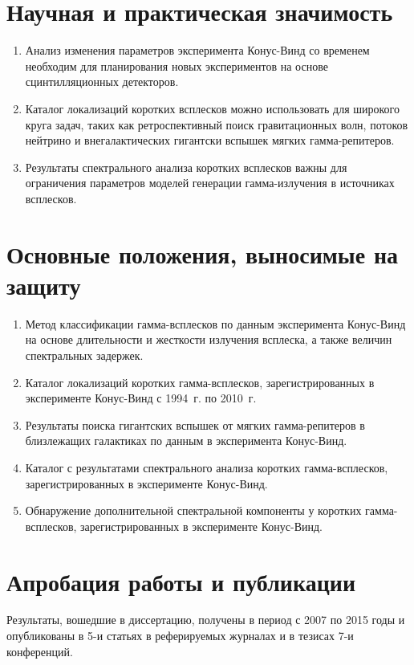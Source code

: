 \section*{Научная и практическая значимость}

\begin{enumerate}
\item Анализ изменения параметров эксперимента Конус-Винд со временем необходим для 
планирования новых экспериментов на основе сцинтилляционных детекторов.
\item Каталог локализаций коротких всплесков можно использовать 
для широкого круга задач, таких как ретроспективный поиск гравитационных волн, потоков нейтрино 
и внегалактических гигантски вспышек мягких гамма-репитеров.
\item Результаты спектрального анализа коротких всплесков важны для ограничения параметров
моделей генерации гамма-излучения в источниках всплесков.
\end{enumerate}

\section*{Основные положения, выносимые на защиту}

\begin{enumerate}
\item Метод классификации гамма-всплесков по данным эксперимента Конус-Винд на основе
    длительности и жесткости излучения всплеска, а также величин спектральных задержек.
\item Каталог локализаций коротких гамма-всплесков, зарегистрированных в эксперименте
    Конус-Винд с 1994~г. по 2010~г.
\item Результаты поиска гигантских вспышек от мягких гамма-репитеров 
    в близлежащих галактиках по данным в эксперимента Конус-Винд. 
\item Каталог с результатами спектрального анализа коротких гамма-всплесков, 
    зарегистрированных в эксперименте Конус-Винд.
\item Обнаружение дополнительной спектральной компоненты у коротких гамма-всплесков, 
    зарегистрированных в эксперименте Конус-Винд.
\end{enumerate}

\section*{Апробация работы и публикации}
Результаты, вошедшие в диссертацию, получены в период с 2007 по 2015
годы и опубликованы в 5-и статьях в реферируемых журналах и в тезисах 7-и конференций. 

